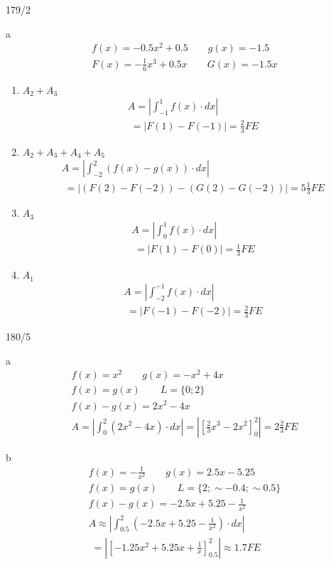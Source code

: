\begin{exercise}{179/2}
  \item [a]
  \begin{gather*}
    f(x) = -0.5x^2 + 0.5 \qquad g(x) = -1.5 \\
    F(x) = -\frac{1}{6}x^3 + 0.5x \qquad G(x) = -1.5x
  \end{gather*}
  \begin{enumerate}[I]
    \item $A_2 + A_3$
    \begin{gather*}
      A = |\int_{-1}^1 f(x) \cdot dx| \\
      \;= |F(1) - F(-1)| = \frac{2}{3}FE
    \end{gather*}
    \item $A_2 + A_3 + A_4 + A_5$
    \begin{gather*}
      A = |\int_{-2}^2 (f(x) - g(x)) \cdot dx| \\
      \;= |(F(2) - F(-2)) - (G(2) - G(-2))| = 5\frac{1}{3}FE
    \end{gather*}
    \item $A_3$
    \begin{gather*}
      A = |\int_0^1 f(x) \cdot dx| \\
      \;= |F(1) - F(0)| = \frac{1}{3}FE
    \end{gather*}
    \item $A_1$
    \begin{gather*}
      A = |\int_{-2}^{-1} f(x) \cdot dx| \\
      \;= |F(-1) - F(-2)| = \frac{2}{3}FE
    \end{gather*}
  \end{enumerate}
\end{exercise}
\begin{exercise}{180/5}
  \item [a]
  \begin{gather*}
    f(x) = x^2 \qquad g(x) = -x^2 + 4x \\
    f(x) = g(x) \qquad L = \{0; 2\} \\
    f(x) - g(x) = 2x^2 - 4x \\
    A = |\int_0^2 (2x^2 - 4x) \cdot dx| = |[\frac{2}{3}x^3 - 2x^2]_0^2| = 2\frac{2}{3}FE
  \end{gather*}
  \item [b]
  \begin{gather*}
    f(x) = -\frac{1}{x^2} \qquad g(x) = 2.5x - 5.25 \\
    f(x) = g(x) \qquad L = \{2; \sim -0.4; \sim 0.5\} \\
    f(x) - g(x) = -2.5x + 5.25 - \frac{1}{x^2} \\
    A \approx |\int_{0.5}^2 (-2.5x + 5.25 - \frac{1}{x^2}) \cdot dx| \\
    \;= |[-1.25x^2 + 5.25x + \frac{1}{x}]_{0.5}^2| \approx 1.7FE
  \end{gather*}
\end{exercise}
